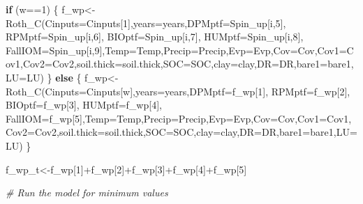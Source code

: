 \documentclass[
  10pt,
  b5paper,
]{book}
\newenvironment{Shaded}{\begin{snugshade}}{\end{snugshade}}
\newcommand{\AttributeTok}[1]{\textcolor[rgb]{0.77,0.63,0.00}{#1}}
\newcommand{\CommentTok}[1]{\textcolor[rgb]{0.56,0.35,0.01}{\textit{#1}}}
\newcommand{\ControlFlowTok}[1]{\textcolor[rgb]{0.13,0.29,0.53}{\textbf{#1}}}
\newcommand{\DecValTok}[1]{\textcolor[rgb]{0.00,0.00,0.81}{#1}}
\newcommand{\FunctionTok}[1]{\textcolor[rgb]{0.00,0.00,0.00}{#1}}
\newcommand{\NormalTok}[1]{#1}
\newcommand{\OtherTok}[1]{\textcolor[rgb]{0.56,0.35,0.01}{#1}}
\newcommand{\SpecialCharTok}[1]{\textcolor[rgb]{0.00,0.00,0.00}{#1}}
\begin{document}
\begin{Shaded}
\begin{Highlighting}[]
\ControlFlowTok{if}\NormalTok{ (w}\SpecialCharTok{==}\DecValTok{1}\NormalTok{) \{}
\NormalTok{f\_wp}\OtherTok{\textless{}{-}}\FunctionTok{Roth\_C}\NormalTok{(}\AttributeTok{Cinputs=}\NormalTok{Cinputs[}\DecValTok{1}\NormalTok{],}\AttributeTok{years=}\NormalTok{years,}\AttributeTok{DPMptf=}\NormalTok{Spin\_up[i,}\DecValTok{5}\NormalTok{], }\AttributeTok{RPMptf=}\NormalTok{Spin\_up[i,}\DecValTok{6}\NormalTok{], }\AttributeTok{BIOptf=}\NormalTok{Spin\_up[i,}\DecValTok{7}\NormalTok{], }\AttributeTok{HUMptf=}\NormalTok{Spin\_up[i,}\DecValTok{8}\NormalTok{], }\AttributeTok{FallIOM=}\NormalTok{Spin\_up[i,}\DecValTok{9}\NormalTok{],}\AttributeTok{Temp=}\NormalTok{Temp,}\AttributeTok{Precip=}\NormalTok{Precip,}\AttributeTok{Evp=}\NormalTok{Evp,}\AttributeTok{Cov=}\NormalTok{Cov,}\AttributeTok{Cov1=}\NormalTok{Cov1,}\AttributeTok{Cov2=}\NormalTok{Cov2,}\AttributeTok{soil.thick=}\NormalTok{soil.thick,}\AttributeTok{SOC=}\NormalTok{SOC,}\AttributeTok{clay=}\NormalTok{clay,}\AttributeTok{DR=}\NormalTok{DR,}\AttributeTok{bare1=}\NormalTok{bare1,}\AttributeTok{LU=}\NormalTok{LU)}
\NormalTok{\} }\ControlFlowTok{else}\NormalTok{ \{}
\NormalTok{f\_wp}\OtherTok{\textless{}{-}}\FunctionTok{Roth\_C}\NormalTok{(}\AttributeTok{Cinputs=}\NormalTok{Cinputs[w],}\AttributeTok{years=}\NormalTok{years,}\AttributeTok{DPMptf=}\NormalTok{f\_wp[}\DecValTok{1}\NormalTok{], }\AttributeTok{RPMptf=}\NormalTok{f\_wp[}\DecValTok{2}\NormalTok{], }\AttributeTok{BIOptf=}\NormalTok{f\_wp[}\DecValTok{3}\NormalTok{], }\AttributeTok{HUMptf=}\NormalTok{f\_wp[}\DecValTok{4}\NormalTok{], }\AttributeTok{FallIOM=}\NormalTok{f\_wp[}\DecValTok{5}\NormalTok{],}\AttributeTok{Temp=}\NormalTok{Temp,}\AttributeTok{Precip=}\NormalTok{Precip,}\AttributeTok{Evp=}\NormalTok{Evp,}\AttributeTok{Cov=}\NormalTok{Cov,}\AttributeTok{Cov1=}\NormalTok{Cov1,}\AttributeTok{Cov2=}\NormalTok{Cov2,}\AttributeTok{soil.thick=}\NormalTok{soil.thick,}\AttributeTok{SOC=}\NormalTok{SOC,}\AttributeTok{clay=}\NormalTok{clay,}\AttributeTok{DR=}\NormalTok{DR,}\AttributeTok{bare1=}\NormalTok{bare1,}\AttributeTok{LU=}\NormalTok{LU)}
\NormalTok{\}}

\NormalTok{f\_wp\_t}\OtherTok{\textless{}{-}}\NormalTok{f\_wp[}\DecValTok{1}\NormalTok{]}\SpecialCharTok{+}\NormalTok{f\_wp[}\DecValTok{2}\NormalTok{]}\SpecialCharTok{+}\NormalTok{f\_wp[}\DecValTok{3}\NormalTok{]}\SpecialCharTok{+}\NormalTok{f\_wp[}\DecValTok{4}\NormalTok{]}\SpecialCharTok{+}\NormalTok{f\_wp[}\DecValTok{5}\NormalTok{]}

\CommentTok{\# Run the model for minimum values}


\end{Highlighting}
\end{Shaded}
\end{document}
